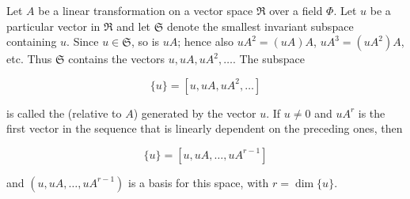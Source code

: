 Let $A$ be a linear transformation on a vector space $\Re$ over a field $\Phi$. Let $u$ be a particular vector in $\Re$ and let $\mathfrak{S}$ denote the smallest invariant subspace containing $u$. Since $u \in \mathfrak{S}$, so is $uA$; hence also $uA^2 = (uA)A$, $uA^3 = (uA^2)A$, etc. Thus $\mathfrak{S}$ contains the vectors $u, uA, uA^2, \dots$. The subspace

$$\{u\} = [u, uA, uA^2, \dots]$$

is called the  (relative to $A$) generated by the vector $u$. If $u \neq 0$ and $uA^r$ is the first vector in the sequence that is linearly dependent on the preceding ones, then

$$\{u\} = [u, uA, \dots, uA^{r-1}]$$

and $(u, uA, \dots, uA^{r-1})$ is a basis for this space, with $r = \dim \{u\}$.
